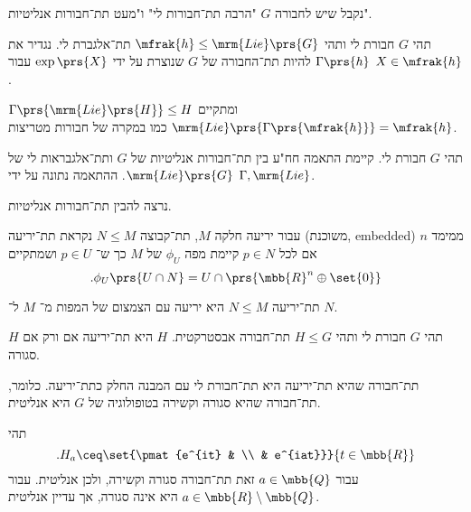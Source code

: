 \documentclass[10pt, twoside]{book}
\newcommand{\textenglish}[1]{\foreignlanguage{english}{#1}}
\newcommand{\Lie}{\mrm{Lie}}
\begin{document}
\begin{remark}
נקבל שיש לחבורה
$G$
"הרבה תת־חבורות לי" ו"מעט תת־חבורות אנליטיות".
\end{remark}

\begin{definition}
תהי
$G$
חבורת לי ותהי
$\mfrak{h} \leq \Lie\prs{G}$
תת־אלגברת לי.
נגדיר את
$\Gamma\prs{h}$
להיות תת־החבורה של
$G$
שנוצרת על ידי
$\exp\prs{X}$
עבור
$X \in \mfrak{h}$.
\end{definition}

\begin{exercise}
$\Gamma\prs{\Lie\prs{H}} \leq H$
ומתקיים
$\Lie\prs{\Gamma\prs{\mfrak{h}}} = \mfrak{h}$
כמו במקרה של חבורות מטריצות.
\end{exercise}

\begin{theorem}[\textenglish{Chevalley}]
תהי
$G$
חבורת לי.
קיימת התאמה חח"ע בין תת־חבורות אנליטיות של
$G$
ותת־אלגבראות לי של
$\Lie\prs{G}$.
ההתאמה נתונה על ידי
$\Gamma, \Lie$.
\end{theorem}

נרצה להבין תת־חבורות אנליטיות.

\begin{definition}[תת־יריעה]
עבור יריעה חלקה
$M$,
תת־קבוצה
$N \leq M$
נקראת תת־יריעה (משוכנת, \textenglish{embedded}) ממימד
$n$
אם לכל
$p \in N$
קיימת מפה
$\phi_U$
של
$M$
כך ש־%
$p \in U$
ושמתקיים
\[\text{.} \phi_U\prs{U \cap N} = U \cap \prs{\mbb{R}^n \oplus \set{0}}\]
\end{definition}

\begin{remark}
תת־יריעה
$N \leq M$
היא יריעה עם הצמצום של המפות מ־%
$M$
ל־%
$N$.
\end{remark}

\begin{theorem}
תהי
$G$
חבורת לי ותהי
$H \leq G$
תת־חבורה אבסטרקטית.
$H$
היא תת־יריעה אם ורק אם
$H$
סגורה.
\end{theorem}

\begin{remark}
תת־חבורה שהיא תת־יריעה היא תת־חבורת לי עם המבנה החלק כתת־יריעה.
כלומר, תת־חבורה שהיא סגורה וקשירה בטופולוגיה של
$G$
היא אנליטית.
\end{remark}

\begin{example}
תהי
\[\text{.} H_a \ceq \set{\pmat{e^{it} & \\ & e^{iat}}}{t \in \mbb{R}}\]
עבור
$a \in \mbb{Q}$
זאת תת־חבורה סגורה וקשירה, ולכן אנליטית. עבור
$a \in \mbb{R} \setminus \mbb{Q}$
היא אינה סגורה, אך עדיין אנליטית.
\end{example}
\end{document}
